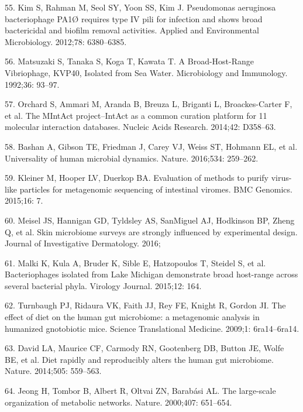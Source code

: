 \documentclass[12pt,]{article}
\begin{document}
\hypertarget{ref-Kim:2012dh}{}
55. Kim S, Rahman M, Seol SY, Yoon SS, Kim J. Pseudomonas aeruginosa
bacteriophage PA1Ø requires type IV pili for infection and shows broad
bactericidal and biofilm removal activities. Applied and Environmental
Microbiology. 2012;78: 6380--6385.

\hypertarget{ref-Matsuzaki:1992gw}{}
56. Matsuzaki S, Tanaka S, Koga T, Kawata T. A Broad-Host-Range
Vibriophage, KVP40, Isolated from Sea Water. Microbiology and
Immunology. 1992;36: 93--97.

\hypertarget{ref-Orchard:2014hq}{}
57. Orchard S, Ammari M, Aranda B, Breuza L, Briganti L, Broackes-Carter
F, et al. The MIntAct project--IntAct as a common curation platform for
11 molecular interaction databases. Nucleic Acids Research. 2014;42:
D358--63.

\hypertarget{ref-Bashan:2016is}{}
58. Bashan A, Gibson TE, Friedman J, Carey VJ, Weiss ST, Hohmann EL, et
al. Universality of human microbial dynamics. Nature. 2016;534:
259--262.

\hypertarget{ref-Kleiner:2015kd}{}
59. Kleiner M, Hooper LV, Duerkop BA. Evaluation of methods to purify
virus-like particles for metagenomic sequencing of intestinal viromes.
BMC Genomics. 2015;16: 7.

\hypertarget{ref-Meisel:2016iu}{}
60. Meisel JS, Hannigan GD, Tyldsley AS, SanMiguel AJ, Hodkinson BP,
Zheng Q, et al. Skin microbiome surveys are strongly influenced by
experimental design. Journal of Investigative Dermatology. 2016;

\hypertarget{ref-Malki:2015dw}{}
61. Malki K, Kula A, Bruder K, Sible E, Hatzopoulos T, Steidel S, et al.
Bacteriophages isolated from Lake Michigan demonstrate broad host-range
across several bacterial phyla. Virology Journal. 2015;12: 164.

\hypertarget{ref-Turnbaugh:2009hf}{}
62. Turnbaugh PJ, Ridaura VK, Faith JJ, Rey FE, Knight R, Gordon JI. The
effect of diet on the human gut microbiome: a metagenomic analysis in
humanized gnotobiotic mice. Science Translational Medicine. 2009;1:
6ra14--6ra14.

\hypertarget{ref-David:2014cl}{}
63. David LA, Maurice CF, Carmody RN, Gootenberg DB, Button JE, Wolfe
BE, et al. Diet rapidly and reproducibly alters the human gut
microbiome. Nature. 2014;505: 559--563.

\hypertarget{ref-Jeong:2000ima}{}
64. Jeong H, Tombor B, Albert R, Oltvai ZN, Barabási AL. The large-scale
organization of metabolic networks. Nature. 2000;407: 651--654.
\end{document}

